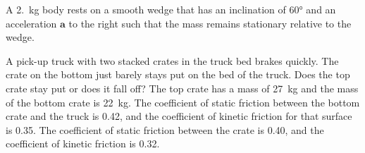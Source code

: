 \documentclass{../../../oss-ap12ibhl}
\begin{document}
\begin{questions}
  \newpage
  
  \question A \SI{2.}{\kilo\gram} body rests on a smooth wedge that has an
  inclination of \ang{60} and an acceleration $\bm{a}$ to the right such that
  the mass remains stationary relative to the wedge.
  \begin{center}
  \end{center}
  \newpage
  
  \question A pick-up truck with two stacked crates in the truck bed brakes
  quickly. The crate on the bottom just barely stays put on the bed of the
  truck. Does the top crate stay put or does it fall off? The top crate has a
  mass of \SI{27}{\kilo\gram} and the mass of the bottom crate is
  \SI{22}{\kilo\gram}. The coefficient of static friction between the bottom
  crate and the truck is 0.42, and the coefficient of kinetic friction for that
  surface is 0.35. The coefficient of static friction between the crate is
  0.40, and the coefficient of kinetic friction is 0.32.
  \newpage
  
\end{questions}
\end{document}
